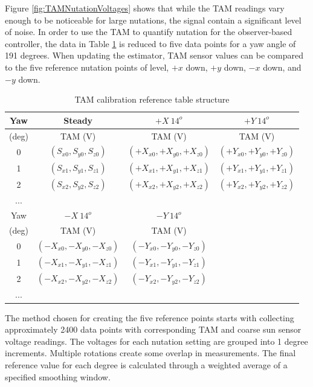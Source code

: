 Figure \ref{fig:TAMNutationVoltages} shows that while the TAM readings vary enough to be noticeable for large nutations, the signal contain a significant level of noise.  In order to use the TAM to quantify nutation for the observer-based controller, the data in Table \ref{tbl:TAMCalibration} is reduced to five data points for a yaw angle of 191 degrees.  When updating the estimator, TAM sensor values can be compared to the five reference nutation points of level, $+x$ down, $+y$ down, $-x$ down, and $-y$ down.

\begin{table}[H]
  \centering
  \begin{tabular}{c|c|c|c}
    \hline
    Yaw   & Steady & $+X \ 14^o$ & $+Y \ 14^o$ \\ \hline
    (deg) & TAM (V) & TAM (V) & TAM (V) \\ \hline
    0 & $(S_{x0},S_{y0},S_{z0})$ & $(+X_{x0},+X_{y0},+X_{z0})$ & $(+Y_{x0},+Y_{y0},+Y_{z0})$\\
    1 & $(S_{x1},S_{y1},S_{z1})$ & $(+X_{x1},+X_{y1},+X_{z1})$ & $(+Y_{x1},+Y_{y1},+Y_{z1})$\\
    2 & $(S_{x2},S_{y2},S_{z2})$ & $(+X_{x2},+X_{y2},+X_{z2})$ & $(+Y_{x2},+Y_{y2},+Y_{z2})$\\
    ... & & &  \\ \hline
    \hline
    Yaw   & $-X \ 14^o$ & $-Y \ 14^o$ \\ \hline
    (deg) & TAM (V) & TAM (V) \\ \hline
    0 & $(-X_{x0},-X_{y0},-X_{z0})$ & $(-Y_{x0},-Y_{y0},-Y_{z0})$\\
    1 & $(-X_{x1},-X_{y1},-X_{z1})$ & $(-Y_{x1},-Y_{y1},-Y_{z1})$\\
    2 & $(-X_{x2},-X_{y2},-X_{z2})$ & $(-Y_{x2},-Y_{y2},-Y_{z2})$\\
    ... & & &  \\ \hline
  \end{tabular}
  \caption{TAM calibration reference table structure}
  \label{tbl:TAMCalibration}
\end{table}

The method chosen for creating the five reference points starts with collecting approximately 2400 data points with corresponding TAM and coarse sun sensor voltage readings.  The voltages for each nutation setting are grouped into 1 degree increments.  Multiple rotations create some overlap in measurements.  The final reference value for each degree is calculated through a weighted average of a specified smoothing window.

